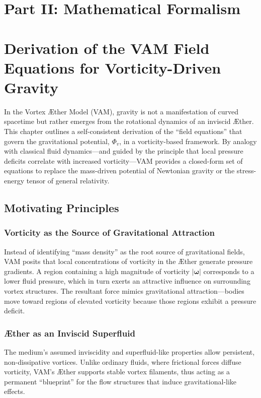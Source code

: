 \documentclass[aps,preprint,superscriptaddress]{revtex4-2}
\begin{document}
    \section*{Part II: Mathematical Formalism}\label{sec:part-2}
    \section{Derivation of the VAM Field Equations for Vorticity-Driven Gravity}
    In the Vortex Æther Model (VAM), gravity is not a manifestation of curved spacetime but rather emerges from the rotational dynamics of an inviscid Æther. This chapter outlines a self-consistent derivation of the “field equations” that govern the gravitational potential, \(\Phi_v\), in a vorticity-based framework. By analogy with classical fluid dynamics—and guided by the principle that local pressure deficits correlate with increased vorticity—VAM provides a closed-form set of equations to replace the mass-driven potential of Newtonian gravity or the stress-energy tensor of general relativity.

    \subsection{Motivating Principles}
    \subsubsection{Vorticity as the Source of Gravitational Attraction}
    Instead of identifying “mass density” as the root source of gravitational fields, VAM posits that local concentrations of vorticity in the Æther generate pressure gradients. A region containing a high magnitude of vorticity \(\lvert \boldsymbol{\omega} \rvert\) corresponds to a lower fluid pressure, which in turn exerts an attractive influence on surrounding vortex structures. The resultant force mimics gravitational attraction—bodies move toward regions of elevated vorticity because those regions exhibit a pressure deficit.

    \subsubsection{Æther as an Inviscid Superfluid}
    The medium’s assumed inviscidity and superfluid-like properties allow persistent, non-dissipative vortices. Unlike ordinary fluids, where frictional forces diffuse vorticity, VAM’s Æther supports stable vortex filaments, thus acting as a permanent “blueprint” for the flow structures that induce gravitational-like effects.
\end{document}
